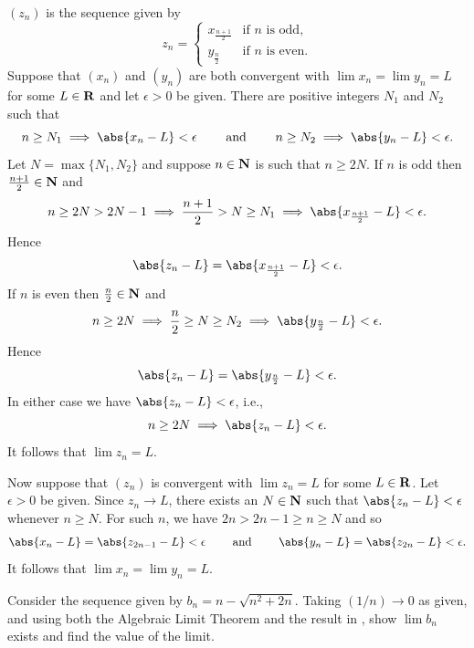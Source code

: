 \documentclass{lew98_solutions}
\begin{document}
\begin{solution}
    \( (z_n) \) is the sequence given by
    \[
        z_n = \begin{cases}
            x_{\frac{n + 1}{2}} & \text{if } n \text{ is odd}, \\
            y_{\frac{n}{2}} & \text{if } n \text{ is even}.
        \end{cases}
    \]
    Suppose that \( (x_n) \) and \( (y_n) \) are both convergent with \( \lim x_n = \lim y_n = L \) for some \( L \in \mathbf{R} \) and let \( \epsilon > 0 \) be given. There are positive integers \( N_1 \) and \( N_2 \) such that
    \[
        n \geq N_1 \implies \abs{x_n - L} < \epsilon \hspaceand[8mm] n \geq N_2 \implies \abs{y_n - L} < \epsilon.
    \]
    Let \( N = \max \{ N_1, N_2 \} \) and suppose \( n \in \mathbf{N} \) is such that \( n \geq 2N \). If \( n \) is odd then \( \frac{n + 1}{2} \in \mathbf{N} \) and
    \[
        n \geq 2N > 2N - 1 \implies \frac{n + 1}{2} > N \geq N_1 \implies \abs{x_{\frac{n + 1}{2}} - L} < \epsilon.
    \]
    Hence
    \[
        \abs{z_n - L} = \abs{x_{\frac{n + 1}{2}} - L} < \epsilon.
    \]
    If \( n \) is even then \( \frac{n}{2} \in \mathbf{N} \) and
    \[
        n \geq 2N \implies \frac{n}{2} \geq N \geq N_2 \implies \abs{y_{\frac{n}{2}} - L} < \epsilon.
    \]
    Hence
    \[
        \abs{z_n - L} = \abs{y_{\frac{n}{2}} - L} < \epsilon.
    \]
    In either case we have \( \abs{z_n - L} < \epsilon \), i.e.,
    \[
        n \geq 2N \implies \abs{z_n - L} < \epsilon.
    \]
    It follows that \( \lim z_n = L \).
    
    Now suppose that \( (z_n) \) is convergent with \( \lim z_n = L \) for some \( L \in \mathbf{R} \). Let \( \epsilon > 0 \) be given. Since \( z_n \to L \), there exists an \( N \in \mathbf{N} \) such that \( \abs{z_n - L} < \epsilon \) whenever \( n \geq N \). For such \( n \), we have \( 2n > 2n - 1 \geq n \geq N \) and so
    \[
        \abs{x_n - L} = \abs{z_{2n - 1} - L} < \epsilon \hspaceand[8mm] \abs{y_n - L} = \abs{z_{2n} - L} < \epsilon.
    \]
    It follows that \( \lim x_n = \lim y_n = L \).
\end{solution}

\begin{exercise}
\label{ex:2.3.6}
    Consider the sequence given by \( b_n = n - \sqrt{n^2 + 2n} \). Taking \( (1/n) \to 0 \) as given, and using both the Algebraic Limit Theorem and the result in , show \( \lim b_n \) exists and find the value of the limit.
\end{exercise}
\end{document}
